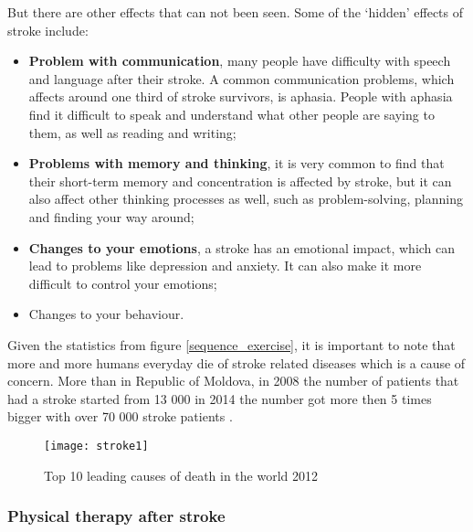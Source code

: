 But there are other effects that can not been seen. Some of the ‘hidden’ effects of stroke include:

\begin{itemize}
\item \textbf{Problem with communication},  many people have difficulty with speech and language after their stroke. A common communication problems, which affects around one third of stroke survivors, is aphasia. People with aphasia find it difficult to speak and understand what other people are saying to them, as well as reading and writing;

\item \textbf{Problems with memory and thinking}, it is very common to find that their short-term memory and concentration is affected by stroke, but it can also affect other thinking processes as well, such as problem-solving, planning and finding your way around;

\item \textbf{Changes to your emotions}, a stroke has an emotional impact, which can lead to problems like depression and anxiety. It can also make it more difficult to control your emotions;

\item Changes to your behaviour.
\end{itemize}

Given the statistics from \mbox{figure} \ref{sequence_exercise}, it is important to note that more and more humans everyday die of stroke related diseases which is a cause of concern. More than in Republic of Moldova, in 2008 the number of patients that had a stroke started from 13 000 in 2014 the number got more then 5 times bigger with over 70 000 stroke patients \cite{strokereferince}.
\begin{figure}[!h]
\centering
\texttt{[image: stroke1]}
\caption{Top 10 leading causes of death in the world 2012 \cite{strokeStatistic}}\label{stroke}
\end{figure}

\subsubsection{Physical therapy after stroke}

